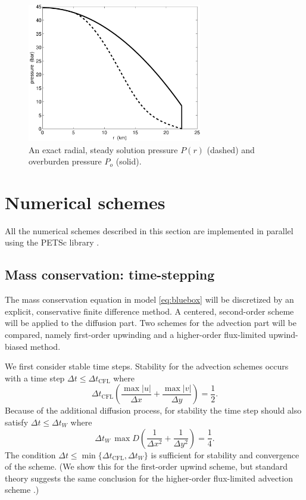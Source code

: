 \documentclass[gmd]{copernicus}   %
\newcommand{\text}{\textrm}
\begin{document}
\begin{figure}[ht]
\includegraphics[width=3.0in,keepaspectratio=true]{exact-P-plot}
\caption{An exact radial, steady solution pressure $P(r)$ (dashed) and overburden pressure $P_o$ (solid).}
\label{fig:Pexact}
\end{figure}


\section{Numerical schemes}  \label{sec:num}

All the numerical schemes described in this section are implemented in parallel using the PETSc library \citep{petsc-user-ref}.

\subsection{Mass conservation: time-stepping}  The mass conservation equation in model \eqref{eq:bluebox} will be discretized by an explicit, conservative finite difference method.   A centered, second-order scheme will be applied to the diffusion part.  Two schemes for the advection part will be compared, namely first-order upwinding and a higher-order flux-limited upwind-biased method.

We first consider stable time steps.  Stability for the advection schemes occurs with a time step $\Delta t \le \Delta t_{\text{CFL}}$ where
\begin{equation}
\Delta t_{\text{CFL}} \left(\frac{\max |u|}{\Delta x} + \frac{\max |v|}{\Delta y}\right) = \frac{1}{2}. \label{eq:dtCFL}
\end{equation}
Because of the additional diffusion process, for stability the time step should also satisfy $\Delta t \le \Delta t_{W}$  where \citep{MortonMayers}
\begin{equation}
\Delta t_W\, \max D \left(\frac{1}{\Delta x^2} + \frac{1}{\Delta y^2}\right) = \frac{1}{4}. \label{eq:dtDIFFW}
\end{equation}
The condition $\Delta t \le \min\{\Delta t_{\text{CFL}}, \Delta t_W\}$ is sufficient for stability and convergence of the scheme.  (We show this for the first-order upwind scheme, but standard theory suggests the same conclusion for the higher-order flux-limited advection scheme \citep{HundsdorferVerwer2010}.)
\end{document}
